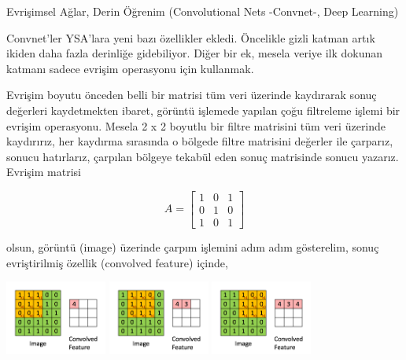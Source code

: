 \documentclass[12pt,fleqn]{article}\usepackage{../../common}
\begin{document}
Evrişimsel Ağlar, Derin Öğrenim (Convolutional Nets -Convnet-, Deep Learning)

Convnet'ler YSA'lara yeni bazı özellikler ekledi. Öncelikle gizli katman
artık ikiden daha fazla derinliğe gidebiliyor. Diğer bir ek, mesela veriye
ilk dokunan katmanı sadece evrişim operasyonu için kullanmak. 

Evrişim boyutu önceden belli bir matrisi tüm veri üzerinde kaydırarak sonuç
değerleri kaydetmekten ibaret, görüntü işlemede yapılan çoğu filtreleme
işlemi bir evrişim operasyonu. Mesela 2 x 2 boyutlu bir filtre matrisini
tüm veri üzerinde kaydırırız, her kaydırma sırasında o bölgede filtre
matrisini değerler ile çarparız, sonucu hatırlarız, çarpılan bölgeye
tekabül eden sonuç matrisinde sonucu yazarız. Evrişim matrisi 

$$ A = \left[\begin{array}{rrr}
1 &  0 & 1 \\ 0 & 1 & 0 \\ 1 & 0 & 1
\end{array}\right]$$

olsun, görüntü (image) üzerinde çarpım işlemini adım adım gösterelim,
sonuç evriştirilmiş özellik (convolved feature) içinde,

\includegraphics[width=9em]{conv-0.png}
\hspace{1cm}
\includegraphics[width=9em]{conv-1.png}
\hspace{1cm}
\includegraphics[width=9em]{conv-2.png}
\end{document}
